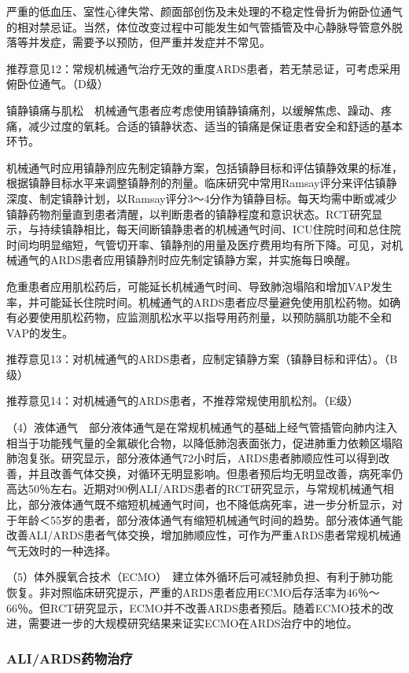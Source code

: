 严重的低血压、室性心律失常、颜面部创伤及未处理的不稳定性骨折为俯卧位通气的相对禁忌证。当然，体位改变过程中可能发生如气管插管及中心静脉导管意外脱落等并发症，需要予以预防，但严重并发症并不常见。

推荐意见12：常规机械通气治疗无效的重度ARDS患者，若无禁忌证，可考虑采用俯卧位通气。（D级）

镇静镇痛与肌松　机械通气患者应考虑使用镇静镇痛剂，以缓解焦虑、躁动、疼痛，减少过度的氧耗。合适的镇静状态、适当的镇痛是保证患者安全和舒适的基本环节。

机械通气时应用镇静剂应先制定镇静方案，包括镇静目标和评估镇静效果的标准，根据镇静目标水平来调整镇静剂的剂量。临床研究中常用Ramsay评分来评估镇静深度、制定镇静计划，以Ramsay评分3～4分作为镇静目标。每天均需中断或减少镇静药物剂量直到患者清醒，以判断患者的镇静程度和意识状态。RCT研究显示，与持续镇静相比，每天间断镇静患者的机械通气时间、ICU住院时间和总住院时间均明显缩短，气管切开率、镇静剂的用量及医疗费用均有所下降。可见，对机械通气的ARDS患者应用镇静剂时应先制定镇静方案，并实施每日唤醒。

危重患者应用肌松药后，可能延长机械通气时间、导致肺泡塌陷和增加VAP发生率，并可能延长住院时间。机械通气的ARDS患者应尽量避免使用肌松药物。如确有必要使用肌松药物，应监测肌松水平以指导用药剂量，以预防膈肌功能不全和VAP的发生。

推荐意见13：对机械通气的ARDS患者，应制定镇静方案（镇静目标和评估）。（B级）

推荐意见14：对机械通气的ARDS患者，不推荐常规使用肌松剂。（E级）

（4）液体通气　部分液体通气是在常规机械通气的基础上经气管插管向肺内注入相当于功能残气量的全氟碳化合物，以降低肺泡表面张力，促进肺重力依赖区塌陷肺泡复张。研究显示，部分液体通气72小时后，ARDS患者肺顺应性可以得到改善，并且改善气体交换，对循环无明显影响。但患者预后均无明显改善，病死率仍高达50％左右。近期对90例ALI/ARDS患者的RCT研究显示，与常规机械通气相比，部分液体通气既不缩短机械通气时间，也不降低病死率，进一步分析显示，对于年龄＜55岁的患者，部分液体通气有缩短机械通气时间的趋势。部分液体通气能改善ALI/ARDS患者气体交换，增加肺顺应性，可作为严重ARDS患者常规机械通气无效时的一种选择。

（5）体外膜氧合技术（ECMO）　建立体外循环后可减轻肺负担、有利于肺功能恢复。非对照临床研究提示，严重的ARDS患者应用ECMO后存活率为46％～66％。但RCT研究显示，ECMO并不改善ARDS患者预后。随着ECMO技术的改进，需要进一步的大规模研究结果来证实ECMO在ARDS治疗中的地位。

\subsubsection{ALI/ARDS药物治疗}

